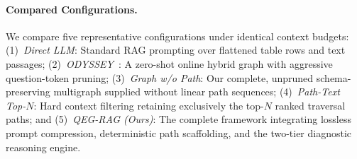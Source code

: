 \documentclass[runningheads]{llncs}
\begin{document}
\paragraph{Compared Configurations.}
We compare five representative configurations under identical context budgets:
(1)~\emph{Direct LLM}: Standard RAG prompting over flattened table rows and text passages;
(2)~\emph{ODYSSEY}~\cite{agarwal2025hybrid}: A zero-shot online hybrid graph with aggressive question-token pruning;
(3)~\emph{Graph w/o Path}: Our complete, unpruned schema-preserving multigraph supplied without linear path sequences;
(4)~\emph{Path-Text Top-$N$}: Hard context filtering retaining exclusively the top-$N$ ranked traversal paths; and
(5)~\emph{QEG-RAG (Ours)}: The complete framework integrating lossless prompt compression, deterministic path scaffolding, and the two-tier diagnostic reasoning engine.
\end{document}
